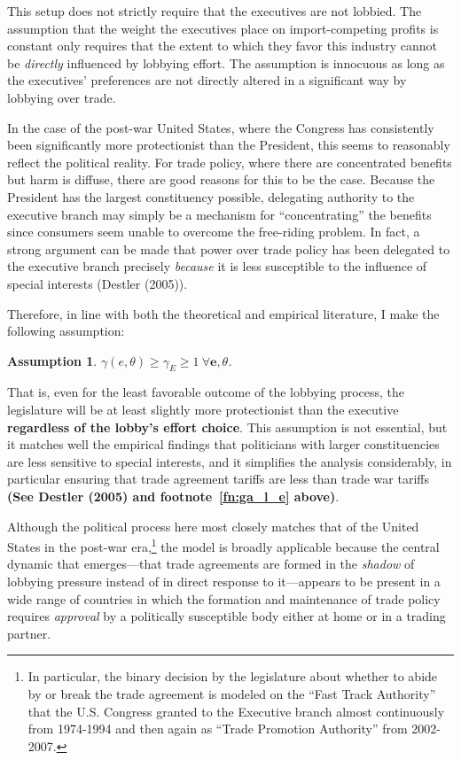 \documentclass[10pt]{article}
\newtheorem{assumption}{Assumption}
\newcommand{\ta}{\theta}
\newcommand{\ga}{\gamma}
\begin{document}
This setup does not strictly require that the executives are not lobbied. The assumption that the weight the executives place on import-competing profits is constant only requires that the extent to which they favor this industry cannot be \textit{directly} influenced by lobbying effort. The assumption is innocuous as long as the executives' preferences are not directly altered in a significant way by lobbying over trade.

In the case of the post-war United States, where the Congress has consistently been significantly more protectionist than the President, this seems to reasonably reflect the political reality. For trade policy, where there are concentrated benefits but harm is diffuse, there are good reasons for this to be the case. Because the President has the largest constituency possible, delegating authority to the executive branch may simply be a mechanism for ``concentrating'' the benefits since consumers seem unable to overcome the free-riding problem. In fact, a strong argument can be made that power over trade policy has been delegated to the executive branch precisely \textit{because} it is less susceptible to the influence of special interests (Destler (2005)).

Therefore, in line with both the theoretical and empirical literature, I make the following assumption:

\begin{assumption}
  $\ga(e,\ta) \geq \ga_E \geq 1 \ \forall \bm{e},\ta$.
  \label{as:ga_l_e}
\end{assumption}

That is, even for the least favorable outcome of the lobbying process, the legislature will be at least slightly more protectionist than the executive \textbf{regardless of the lobby's effort choice}. This assumption is not essential, but it matches well the empirical findings that politicians with larger constituencies are less sensitive to special interests, and it simplifies the analysis considerably, in particular ensuring that trade agreement tariffs are less than trade war tariffs \textbf{(See Destler (2005) and footnote~\ref{fn:ga_l_e} above)}.

Although the political process here most closely matches that of the United States in the post-war era,\footnote{In particular, the binary decision by the legislature about whether to abide by or break the trade agreement is modeled on the ``Fast Track Authority'' that the U.S. Congress granted to the Executive branch almost continuously from 1974-1994 and then again as ``Trade Promotion Authority'' from 2002-2007.} the model is broadly applicable because the central dynamic that emerges---that trade agreements are formed in the \textit{shadow} of lobbying pressure instead of in direct response to it---appears to be present in a wide range of countries in which the formation and maintenance of trade policy requires \textit{approval} by a politically susceptible body either at home or in a trading partner.
\end{document}
